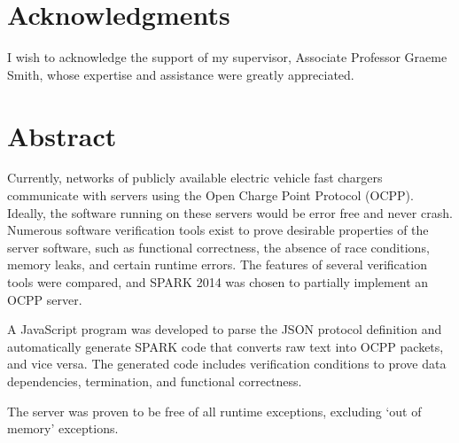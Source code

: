 \documentclass[12pt,openany,a4paper]{book}
\begin{document}
\cleardoublepage


\chapter{Acknowledgments}

I wish to acknowledge the support of my supervisor, Associate Professor Graeme Smith, whose expertise and assistance were greatly appreciated.
\cleardoublepage

\chapter{Abstract}

Currently, networks of publicly available electric vehicle fast chargers communicate with servers using the Open Charge Point Protocol (OCPP). Ideally, the software running on these servers would be error free and never crash. Numerous software verification tools exist to prove desirable properties of the server software, such as functional correctness, the absence of race conditions, memory leaks, and certain runtime errors. The features of several verification tools were compared, and SPARK 2014 was chosen to partially implement an OCPP server.

A JavaScript program was developed to parse the JSON protocol definition and automatically generate SPARK code that converts raw text into OCPP packets, and vice versa. The generated code includes verification conditions to prove data dependencies, termination, and functional correctness.

The server was proven to be free of all runtime exceptions, excluding `out of memory' exceptions.





\tableofcontents

\listoffigures
{}

\listoftables
{}

% 

\cleardoublepage
\end{document}
